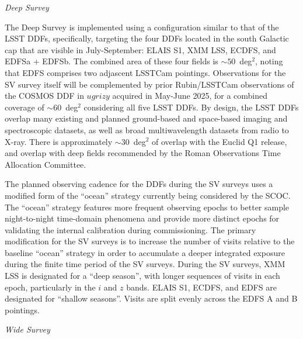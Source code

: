 \textit{Deep Survey}

The Deep Survey is implemented using a configuration similar to that of the LSST DDFs, specifically, targeting the four DDFs located in the south Galactic cap that are visible in July-September: ELAIS S1, XMM LSS, ECDFS, and EDFSa + EDFSb.
The combined area of these four fields is $\sim50$~deg$^2$, noting that EDFS comprises two adjascent LSSTCam pointings.
Observations for the SV survey itself will be complemented by prior Rubin/LSSTCam observations of the COSMOS DDF in $ugrizy$ acquired in May-June 2025, for a combined coverage of $\sim60$~deg$^2$ considering all five LSST DDFs.
By design, the LSST DDFs overlap many existing and planned ground-based and space-based imaging and spectroscopic datasets, as well as broad multiwavelength datasets from radio to X-ray.
There is approximately $\sim30$~deg$^2$ of overlap with the Euclid Q1 release, and overlap with deep fields recommended by the Roman Observations Time Allocation Committee.

The planned observing cadence for the DDFs during the SV surveys uses a modified form of the ``ocean'' strategy currently being considered by the SCOC.
The ``ocean'' strategy features more frequent observing epochs to better sample night-to-night time-domain phenomena and provide more distinct epochs for validating the internal calibration during commissioning.
The primary modification for the SV surveys is to increase the number of visits relative to the baseline ``ocean'' strategy in order to accumulate a deeper integrated exposure during the finite time period of the SV surveys.
During the SV surveys, XMM LSS is designated for a ``deep season'', with longer sequences of visits in each epoch, particularly in the $i$ and $z$ bands.
ELAIS S1, ECDFS, and EDFS are designated for ``shallow seasons''.
Visits are split evenly across the EDFS A and B pointings.

\textit{Wide Survey}

